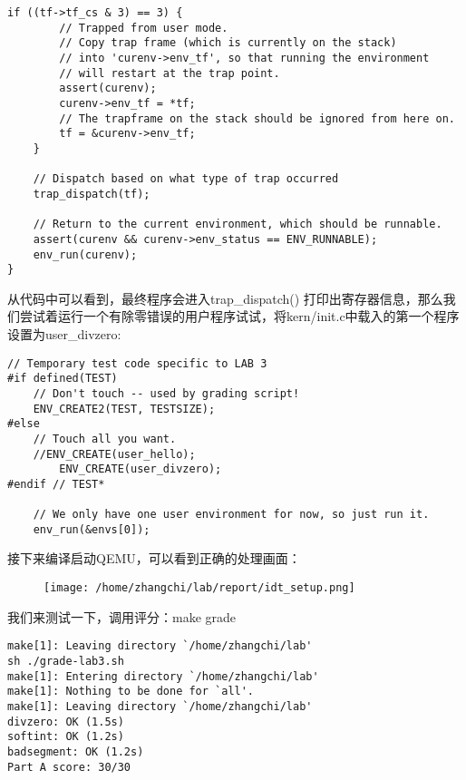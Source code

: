 \documentclass{article}
\newcommand{\funcname}[1]{{\ttfamily \small #1}}
\begin{document}
\begin{CJK*}{UTF8}{gkai}
\begin{lstlisting}[style=ccode, title={\scriptsize \ttfamily \bfseries kern/trap.c}]
	if ((tf->tf_cs & 3) == 3) {
		// Trapped from user mode.
		// Copy trap frame (which is currently on the stack)
		// into 'curenv->env_tf', so that running the environment
		// will restart at the trap point.
		assert(curenv);
		curenv->env_tf = *tf;
		// The trapframe on the stack should be ignored from here on.
		tf = &curenv->env_tf;
	}
	
	// Dispatch based on what type of trap occurred
	trap_dispatch(tf);

	// Return to the current environment, which should be runnable.
	assert(curenv && curenv->env_status == ENV_RUNNABLE);
	env_run(curenv);
}

\end{lstlisting}


从代码中可以看到，最终程序会进入\funcname{trap\_dispatch()} 打印出寄存器信息，那么我们尝试着运行一个有除零错误的用户程序试试，将kern/init.c中载入的第一个程序设置为user\_divzero:

\begin{lstlisting}[style=ccode, firstnumber=44, title={\scriptsize \ttfamily \bfseries kern/init.c: i386\_init()}]
	// Temporary test code specific to LAB 3
#if defined(TEST)
	// Don't touch -- used by grading script!
	ENV_CREATE2(TEST, TESTSIZE);
#else
	// Touch all you want.
	//ENV_CREATE(user_hello);
        ENV_CREATE(user_divzero);
#endif // TEST*

	// We only have one user environment for now, so just run it.
	env_run(&envs[0]);
\end{lstlisting}

接下来编译启动QEMU，可以看到正确的处理画面：


\begin{figure}[htp]
\centering
\texttt{[image: /home/zhangchi/lab/report/idt\_setup.png]}
\end{figure}

我们来测试一下，调用评分：make grade

\begin{lstlisting}[style=console]
make[1]: Leaving directory `/home/zhangchi/lab'
sh ./grade-lab3.sh
make[1]: Entering directory `/home/zhangchi/lab'
make[1]: Nothing to be done for `all'.
make[1]: Leaving directory `/home/zhangchi/lab'
divzero: OK (1.5s)
softint: OK (1.2s)
badsegment: OK (1.2s)
Part A score: 30/30


\end{lstlisting}
\end{CJK*}
\end{document}

